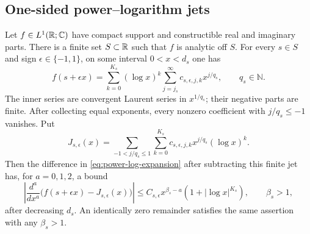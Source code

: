 \subsection{One-sided power--logarithm jets}
\begin{lemma}
\label{lem:power-log-jet}
Let $f\in L^1(\mathbb R;\mathbb C)$ have compact support and constructible
real and imaginary parts. There is a finite set $S\subset\mathbb R$ such that
$f$ is analytic off $S$. For every $s\in S$ and sign
$\epsilon\in\{-1,1\}$, on some interval $0<x<d_s$ one has
\begin{equation}\label{eq:power-log-expansion}
 f(s+\epsilon x)=\sum_{k=0}^{K_s}(\log x)^k
                         \sum_{j=j_s}^{\infty}c_{s,\epsilon,j,k}x^{j/q_s},
 \qquad q_s\in\mathbb N.
\end{equation}
The inner series are convergent Laurent series in $x^{1/q_s}$; their
negative parts are finite. After collecting equal exponents, every
nonzero coefficient with $j/q_s\le-1$ vanishes. Put
\begin{equation}\label{eq:power-log-jet}
 J_{s,\epsilon}(x)=
    \sum_{-1<j/q_s\le1}\sum_{k=0}^{K_s}
                           c_{s,\epsilon,j,k}x^{j/q_s}(\log x)^k.
\end{equation}
Then the difference in \eqref{eq:power-log-expansion} after subtracting
this finite jet has, for $a=0,1,2$, a bound
\begin{equation}\label{eq:power-log-remainder}
 \left|\frac{d^a}{dx^a}
       \bigl(f(s+\epsilon x)-J_{s,\epsilon}(x)\bigr)\right|
 \le C_{s,\epsilon}x^{\beta_s-a}(1+|\log x|^{K_s}),
 \qquad \beta_s>1,
\end{equation}
after decreasing $d_s$. An identically zero remainder satisfies the
same assertion with any $\beta_s>1$.
\end{lemma}
